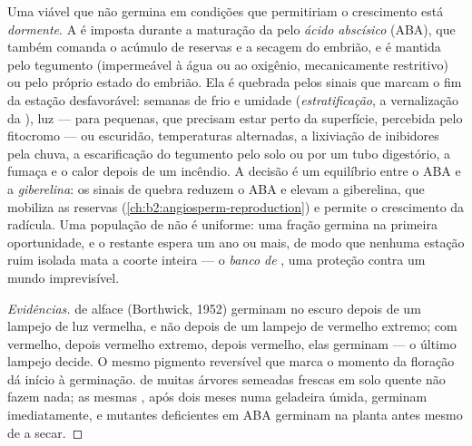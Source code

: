 \begin{definition}\label{def:b2:plant-flowering:dormancy}
Uma  viável que não germina em condições que permitiriam o
crescimento está \emph{dormente}. A  é imposta durante a
maturação da  pelo \emph{ácido abscísico} (ABA), que também
comanda o acúmulo de reservas e a secagem do embrião, e é mantida pelo
tegumento (impermeável à água ou ao oxigênio, mecanicamente
restritivo) ou pelo próprio estado do embrião. Ela é quebrada pelos
sinais que marcam o fim da estação desfavorável: semanas de frio e
umidade (\emph{estratificação}, a vernalização da ), luz ---
para  pequenas, que precisam estar perto da superfície,
percebida pelo fitocromo --- ou escuridão, temperaturas alternadas, a
lixiviação de inibidores pela chuva, a escarificação do tegumento pelo
solo ou por um tubo digestório, a fumaça e o calor depois de um
incêndio. A decisão é um equilíbrio entre o ABA e a
\emph{giberelina}: os sinais de quebra reduzem o ABA e elevam a
giberelina, que mobiliza as reservas (\cref{ch:b2:angiosperm-reproduction}) e permite o crescimento
da radícula. Uma população de  não é uniforme: uma fração
germina na primeira oportunidade, e o restante espera um ano ou mais,
de modo que nenhuma estação ruim isolada mata a coorte inteira --- o
\emph{banco de }, uma proteção contra um mundo imprevisível.
\end{definition}
\begin{proof}[Evidências]
 de alface (Borthwick, 1952) germinam no escuro depois de um
lampejo de luz vermelha, e não depois de um lampejo de vermelho
extremo; com vermelho, depois vermelho extremo, depois vermelho, elas
germinam --- o último lampejo decide. O mesmo pigmento reversível que
marca o momento da floração dá início à germinação.  de muitas
árvores semeadas frescas em solo quente não fazem nada; as mesmas
, após dois meses numa geladeira úmida, germinam imediatamente,
e mutantes deficientes em ABA germinam na planta antes mesmo de a
 secar.
\end{proof}


